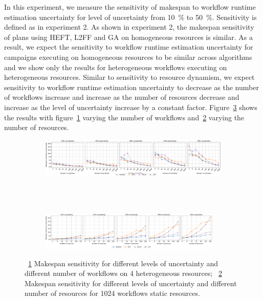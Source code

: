 In this experiment, we measure the sensitivity of makespan to workflow runtime estimation uncertainty for level of uncertainty from 10~\% to 50~\%.
Sensitivity is defined as in experiment 2.
As shown in experiment 2, the makespan sensitivity of plans using HEFT, L2FF and GA on homogeneous resources is similar.
As a result, we expect the sensitivity to workflow runtime estimation uncertainty for campaigns executing on homogeneous resources to be similar across algorithms and we show only the results for heterogeneous workflows executing on heterogeneous resources.
Similar to sensitivity to resource dynamism, we expect sensitivity to workflow runtime estimation uncertainty to decrease as the number of workflows increase and increase as the number of resources decrease and increase as the level of uncertainty increase by a constant factor.
Figure~\ref{fig:inaccur_st} shows the results with figure~\ref{fig:InaccurStHeteroCampaigns_4StHeteroResourcesSens} varying the number of workflows and~\ref{fig:InaccurStHeteroResources_StHeteroCampaignsSens} varying the number of resources.

\begin{figure}[ht!]
    \centering
    \begin{subfigure}[b]{0.95\textwidth}
        \includegraphics[width=.95\textwidth]{figures/campaign/InaccurStHeteroCampaigns_4StHeteroResourcesSens.pdf}
        \caption{}
        \label{fig:InaccurStHeteroCampaigns_4StHeteroResourcesSens}
    \end{subfigure}\\
    ~ 
    \begin{subfigure}[b]{0.95\textwidth}
        \includegraphics[width=0.95\textwidth]{figures/campaign/InaccurStHeteroResources_StHeteroCampaignsSens.pdf}
        \caption{}
        \label{fig:InaccurStHeteroResources_StHeteroCampaignsSens}
    \end{subfigure}
    \caption{~\ref{fig:InaccurStHeteroCampaigns_4StHeteroResourcesSens} Makespan sensitivity for different levels of uncertainty and different number of workflows on 4 heterogeneous resources;
    ~\ref{fig:InaccurStHeteroResources_StHeteroCampaignsSens} Makespan sensitivity for different levels of uncertainty and different number of resources for 1024 workflows static resources.}
    \label{fig:inaccur_st}
\end{figure}

